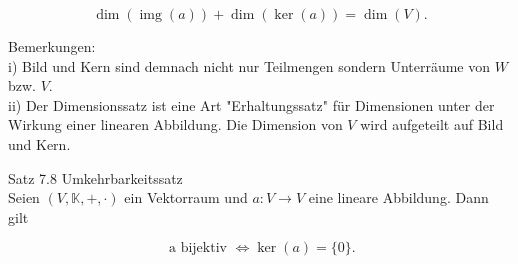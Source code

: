 \documentclass[10pt]{article}
\begin{document}
\begin{equation*}
\operatorname{dim}(\operatorname{img}(a))+\operatorname{dim}(\operatorname{ker}(a))=\operatorname{dim}(V) . \tag{7.46}
\end{equation*}


Bemerkungen:\\
i) Bild und Kern sind demnach nicht nur Teilmengen sondern Unterräume von $W$ bzw. $V$.\\
ii) Der Dimensionssatz ist eine Art "Erhaltungssatz" für Dimensionen unter der Wirkung einer linearen Abbildung. Die Dimension von $V$ wird aufgeteilt auf Bild und Kern.

Satz 7.8 Umkehrbarkeitssatz\\
Seien $(V, \mathbb{K},+, \cdot)$ ein Vektorraum und $a: V \rightarrow V$ eine lineare Abbildung. Dann gilt


\begin{equation*}
\text { a bijektiv } \Leftrightarrow \operatorname{ker}(a)=\{0\} . \tag{7.47}
\end{equation*}
\end{document}
